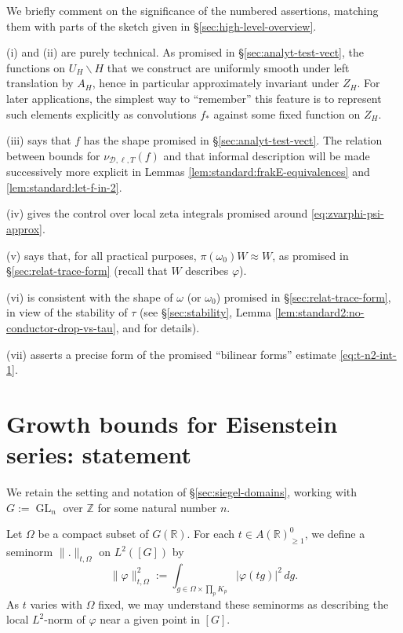 \documentclass[reqno]{amsart}
\DeclareMathOperator{\GL}{GL}
\theoremstyle{plain} \newtheorem{theorem} {Theorem}
\theoremstyle{definition} \newtheorem{definition} [theorem] {Definition}
\theoremstyle{itplain} %
\numberwithin{equation}{section}
\numberwithin{theorem}{section}
\renewcommand{\geq}{\geqslant}
\begin{document}
\begin{remark}\label{rmk:we-briefly-comment}
  We briefly comment on the significance of the numbered assertions, matching them with parts of the sketch given in \S\ref{sec:high-level-overview}.

  (i) and (ii) are purely technical.  As promised in \S\ref{sec:analyt-test-vect}, the functions on $U_{H} \backslash H$ that we construct are uniformly smooth under left translation by $A_H$, hence in particular approximately invariant under $Z_H$.  For later applications, the simplest way to ``remember'' this feature is to represent such elements explicitly as convolutions $f_{\ast}$ against some fixed function on $Z_H$.

  (iii) says that $f$ has the shape promised in \S\ref{sec:analyt-test-vect}.  The relation between bounds for $\nu_{\mathcal{D},\ell,T}(f)$ and that informal description will be made successively more explicit in Lemmas \ref{lem:standard:frakE-equivalences} and \ref{lem:standard:let-f-in-2}.

  (iv) gives the control over local zeta integrals promised around \eqref{eq:zvarphi-psi-approx}.

  (v) says that, for all practical purposes, $\pi(\omega_0) W \approx W$, as promised in \S\ref{sec:relat-trace-form} (recall that $W$ describes $\varphi$).

  (vi) is consistent with the shape of $\omega$ (or $\omega_0$) promised in \S\ref{sec:relat-trace-form}, in view of the stability of $\tau$ (see \S\ref{sec:stability}, Lemma \ref{lem:standard2:no-conductor-drop-vs-tau}, \cite[Thm 17.1]{nelson-venkatesh-1} and \cite[\S14.9]{2020arXiv201202187N} for details).

  (vii) asserts a precise form of the promised ``bilinear forms'' estimate \eqref{eq:t-n2-int-1}.
\end{remark}


\section{Growth bounds for Eisenstein series: statement}
We retain the setting and notation of \S\ref{sec:siegel-domains}, working with $G := \GL_n$ over $\mathbb{Z}$ for some natural number $n$.

Let $\Omega$ be a compact subset of $G(\mathbb{R})$.  For each $t \in A(\mathbb{R})^0_{\geq 1}$, we define a seminorm $\|.\|_{t,\Omega}$ on $L^2([G])$ by
\begin{equation}\label{eq:varphi-2_r-:=}
  \|\varphi \|^2_{t,\Omega} :=
  \int _{g \in \Omega \times \prod_p K_p }
  |\varphi(t g)|^2
  \, d g.
\end{equation}
As $t$ varies with $\Omega$ fixed, we may understand these seminorms as describing the local $L^2$-norm of $\varphi$ near a given point in $[G]$.
\end{document}
